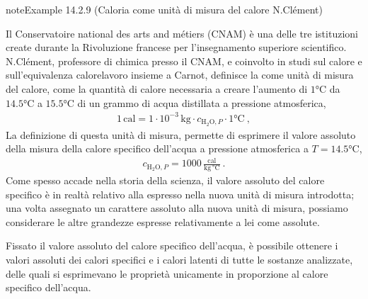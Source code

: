 \documentclass[letterpaper,10pt,italian]{jupyterBook}
\begin{document}
\begin{sphinxadmonition}{note}{Example 14.2.9 (Caloria come unità di misura del calore \sphinxhyphen{} N.Clément)}



\sphinxAtStartPar
Il Conservatoire national des arts and métiers (CNAM) è una delle tre istituzioni create durante la Rivoluzione francese per l’insegnamento superiore scientifico. N.Clément, professore di chimica presso il CNAM, e coinvolto in studi sul calore e sull’equivalenza calore\sphinxhyphen{}lavoro insieme a Carnot, definisce la  come unità di misura del calore, come la quantità di calore necessaria a creare l’aumento di \(1 \text{°C}\) da \(14.5 \text{°C}\) a \(15.5 \text{°C}\) di un grammo di acqua distillata a pressione atmosferica,
\begin{equation*}
\begin{split}1 \, \text{cal} = 1 \cdot 10^{-3} \, \text{kg} \cdot c_{\text{H$_2$O},P} \cdot 1 \text{°C} \ ,\end{split}
\end{equation*}
\sphinxAtStartPar
La definizione di questa unità di misura, permette di esprimere il valore assoluto della misura della calore specifico dell’acqua a pressione atmosferica a \(T = 14.5 \text{°C}\),
\begin{equation*}
\begin{split}c_{\text{H$_2$O},P} = 1000 \, \frac{\text{cal}}{\text{kg} \, \text{°C}} \ .\end{split}
\end{equation*}
\sphinxAtStartPar
{} Come spesso accade nella storia della scienza, il valore assoluto del calore specifico è in realtà relativo alla \sphinxhyphen{} espresso nella \sphinxhyphen{} nuova unità di misura introdotta; una volta assegnato un carattere assoluto alla nuova unità di misura, possiamo considerare le altre grandezze espresse relativamente a lei come assolute.

\sphinxAtStartPar
{} Fissato il valore assoluto del calore specifico dell’acqua, è possibile ottenere i valori assoluti dei calori specifici e i calori latenti di tutte le sostanze analizzate, delle quali si esprimevano le proprietà unicamente in proporzione al calore specifico dell’acqua.
\end{sphinxadmonition}
\end{document}
